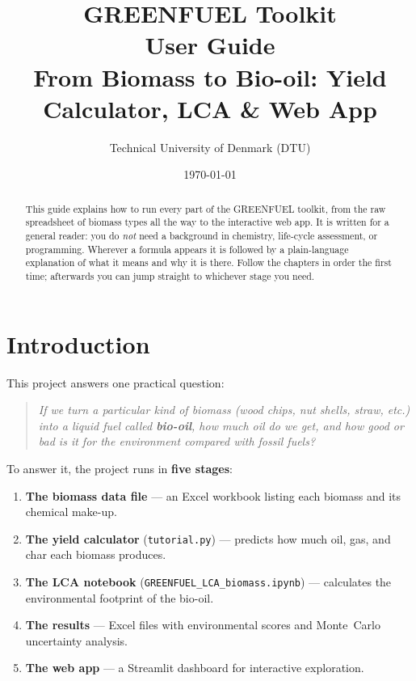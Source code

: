 \documentclass[11pt, a4paper]{article}
\title{\textbf{GREENFUEL Toolkit}\\[4pt]
       \large User Guide\\[0.3em]
       \normalsize From Biomass to Bio-oil: Yield Calculator, LCA \& Web App}
\author{Technical University of Denmark (DTU)}
\date{\today}
\newcommand{\code}[1]{\texttt{#1}}
\begin{document}
\maketitle

\begin{abstract}
\noindent
This guide explains how to run every part of the GREENFUEL toolkit, from the raw
spreadsheet of biomass types all the way to the interactive web app. It is written
for a general reader: you do \emph{not} need a background in chemistry,
life-cycle assessment, or programming. Wherever a formula appears it is followed
by a plain-language explanation of what it means and why it is there. Follow the
chapters in order the first time; afterwards you can jump straight to whichever
stage you need.
\end{abstract}

\tableofcontents
\newpage

\section{Introduction}

This project answers one practical question:

\begin{quote}
\emph{If we turn a particular kind of biomass (wood chips, nut shells, straw,
etc.) into a liquid fuel called \textbf{bio-oil}, how much oil do we get, and how
good or bad is it for the environment compared with fossil fuels?}
\end{quote}

To answer it, the project runs in \textbf{five stages}:

\begin{enumerate}
  \item \textbf{The biomass data file} --- an Excel workbook listing each biomass
        and its chemical make-up.
  \item \textbf{The yield calculator} (\code{tutorial.py}) --- predicts how much
        oil, gas, and char each biomass produces.
  \item \textbf{The LCA notebook} (\code{GREENFUEL\_LCA\_biomass.ipynb}) ---
        calculates the environmental footprint of the bio-oil.
  \item \textbf{The results} --- Excel files with environmental scores and
        Monte~Carlo uncertainty analysis.
  \item \textbf{The web app} --- a Streamlit dashboard for interactive
        exploration.
\end{enumerate}
\end{document}
